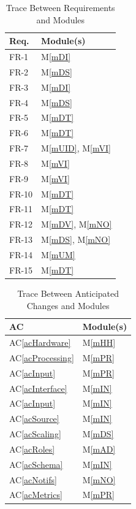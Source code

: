 \documentclass[12pt, titlepage]{article}
\newcommand{\acref}[1]{AC\ref{#1}}
\newcommand{\mref}[1]{M\ref{#1}}
\begin{document}
\begin{table}[H]
\centering
\begin{tabular}{p{} p{}}
\toprule
\textbf{Req.} & \textbf{Module(s)}\\
\midrule
FR-1 & \mref{mDI} \\
FR-2 & \mref{mDS} \\
FR-3 & \mref{mDI} \\
FR-4 & \mref{mDS} \\
FR-5 & \mref{mDT} \\
FR-6 & \mref{mDT} \\
FR-7 & \mref{mUID}, \mref{mVI} \\
FR-8 & \mref{mVI} \\
FR-9 & \mref{mVI} \\
FR-10 & \mref{mDT} \\
FR-11 & \mref{mDT} \\
FR-12 & \mref{mDV}, \mref{mNO} \\
FR-13 & \mref{mDS}, \mref{mNO} \\
FR-14 & \mref{mUM} \\
FR-15 & \mref{mDT} \\
\bottomrule
\end{tabular}
\caption{Trace Between Requirements and Modules}
\label{TblRT}
\end{table}

\begin{table}[H]
\centering
\begin{tabular}{p{} p{}}
\toprule
\textbf{AC} & \textbf{Module(s)}\\
\midrule
\acref{acHardware} & \mref{mHH}\\
\acref{acProcessing} & \mref{mPR}\\
\acref{acInput} & \mref{mPR}\\
\acref{acInterface} & \mref{mIN}\\
\acref{acInput} & \mref{mIN}\\
\acref{acSource} & \mref{mIN}\\
\acref{acScaling} & \mref{mDS}\\
\acref{acRoles} & \mref{mAD}\\
\acref{acSchema} & \mref{mIN}\\
\acref{acNotifs} & \mref{mNO}\\
\acref{acMetrics} & \mref{mPR}\\
\bottomrule
\end{tabular}
\caption{Trace Between Anticipated Changes and Modules}
\label{TblACT}
\end{table}
\end{document}
